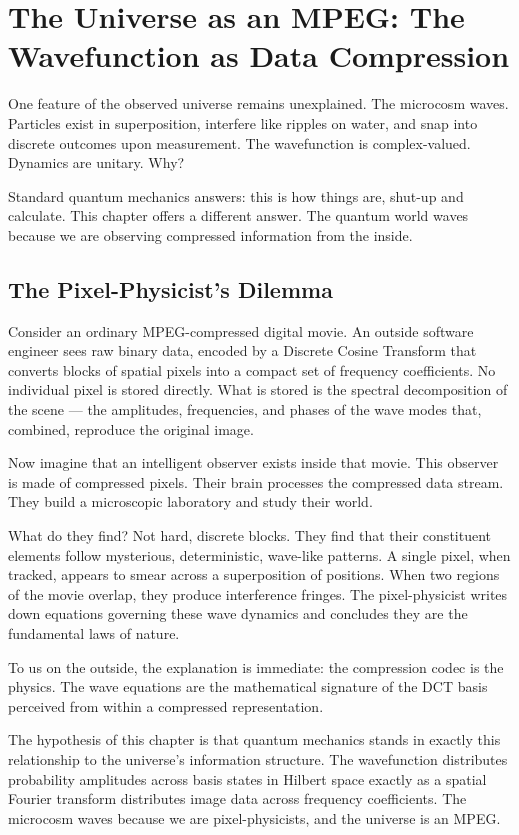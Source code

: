 \chapter{The Universe as an MPEG: The Wavefunction as Data Compression}

One feature of the observed universe remains unexplained. The microcosm
waves. Particles exist in superposition, interfere like ripples on water,
and snap into discrete outcomes upon measurement. The wavefunction is
complex-valued. Dynamics are unitary. Why?

Standard quantum mechanics answers: this is how things are, shut-up 
and calculate. This chapter offers a different answer. The quantum
world waves because we are observing compressed information from the
inside.

\section{The Pixel-Physicist's Dilemma}

Consider an ordinary MPEG-compressed digital movie. An outside software
engineer sees raw binary data, encoded by a Discrete Cosine Transform
that converts blocks of spatial pixels into a compact set of frequency
coefficients. No individual pixel is stored directly. What is stored is
the spectral decomposition of the scene --- the amplitudes, frequencies,
and phases of the wave modes that, combined, reproduce the original image.

Now imagine that an intelligent observer exists inside that movie. This
observer is made of compressed pixels. Their brain processes the
compressed data stream. They build a microscopic laboratory and study
their world.

What do they find? Not hard, discrete blocks. They find that their
constituent elements follow mysterious, deterministic, wave-like patterns.
A single pixel, when tracked, appears to smear across a superposition of
positions. When two regions of the movie overlap, they produce
interference fringes. The pixel-physicist writes down equations governing
these wave dynamics and concludes they are the fundamental laws of
nature.

To us on the outside, the explanation is immediate: the compression codec
is the physics. The wave equations are the mathematical signature of the
DCT basis perceived from within a compressed representation.

The hypothesis of this chapter is that quantum mechanics stands in
exactly this relationship to the universe's information structure. The
wavefunction distributes probability amplitudes across basis states in
Hilbert space exactly as a spatial Fourier transform distributes image
data across frequency coefficients. The microcosm waves because we are
pixel-physicists, and the universe is an MPEG.

